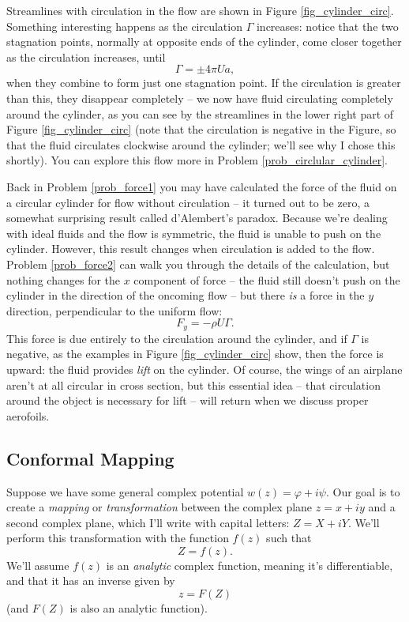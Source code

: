 Streamlines with circulation in the flow are shown in Figure \ref{fig_cylinder_circ}.  Something interesting happens as the circulation $\Gamma$ increases:  notice that the two stagnation points, normally at opposite ends of the cylinder, come closer together as the circulation increases, until 
\[
\Gamma = \pm 4\pi U a,
\]
when they combine to form just one stagnation point.  If the circulation is greater than this, they disappear completely -- we now have fluid circulating completely around the cylinder, as you can see by the streamlines in the lower right part of Figure \ref{fig_cylinder_circ} (note that the circulation is negative in the Figure, so that the fluid circulates clockwise around the cylinder; we'll see why I chose this shortly).  You can explore this flow more in Problem \ref{prob_circlular_cylinder}.

Back in Problem \ref{prob_force1} you may have calculated the force of the fluid on a circular cylinder for flow without circulation -- it turned out to be zero, a somewhat surprising result called d'Alembert's paradox.  Because we're dealing with ideal fluids and the flow is symmetric, the fluid is unable to push on the cylinder.  However, this result changes when circulation is added to the flow.  Problem \ref{prob_force2} can walk you through the details of the calculation, but nothing changes for the $x$ component of force -- the fluid still doesn't push on the cylinder in the direction of the oncoming flow -- but there \emph{is} a force in the $y$ direction, perpendicular to the uniform flow:
\begin{equation}
\label{eq_force1}
F_y = -\rho U \Gamma.
\end{equation}
This force is due entirely to the circulation around the cylinder, and if $\Gamma$ is negative, as the examples in Figure \ref{fig_cylinder_circ} show, then the force is upward:  the fluid provides \emph{lift} on the cylinder.  Of course, the wings of an airplane aren't at all circular in cross section, but this essential idea -- that circulation around the object is necessary for lift -- will return when we discuss proper aerofoils.




\subsection{Conformal Mapping}

Suppose we have some general complex potential $w(z) = \varphi + i\psi$.  Our goal is to create a \emph{mapping} or \emph{transformation} between the complex plane $z = x+iy$ and a second complex plane, which I'll write with capital letters: $Z = X + iY$.  We'll perform this transformation with the function $f(z)$ such that
\begin{equation}
Z = f(z).
\end{equation}
We'll assume $f(z)$ is an \emph{analytic} complex function, meaning it's differentiable, and that it has an inverse given by
\begin{equation}
z = F(Z)
\end{equation}
(and $F(Z)$ is also an analytic function).

